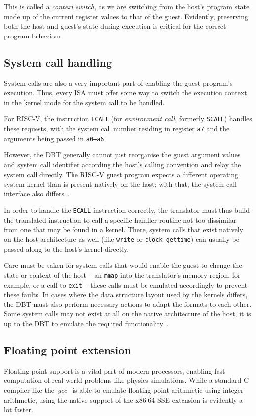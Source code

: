 This is called a \textit{context switch}, as we are switching from the host's program state made up of the current register values to that of the guest.
Evidently, preserving both the host and guest's state during execution is critical for the correct program behaviour.

\subsection{System call handling}
\label{sec:syscall-handling}
System calls are also a very important part of enabling the guest program's execution.
Thus, every ISA must offer some way to switch the execution context in the kernel mode for the system call to be handled.

For RISC-V, the instruction \texttt{ECALL} (for \textit{environment call}, formerly \texttt{SCALL}) handles these requests, with the system call number residing in register \texttt{a7} and the arguments being passed in \texttt{a0--a6}.

However, the DBT generally cannot just reorganise the guest argument values and system call identifier according the host's calling convention and relay the system call directly.
The RISC-V guest program expects a different operating system kernel than is present natively on the host;
with that, the system call interface also differs~\cite[S. 2f.]{bintrans}.

In order to handle the \texttt{ECALL} instruction correctly, the translator must thus build the translated instruction to call a specific handler routine not too dissimilar from one that may be found in a kernel.
There, system calls that exist natively on the host architecture as well (like \texttt{write} or \texttt{clock\_gettime}) can usually be passed along to the host's kernel directly.

Care must be taken for system calls that would enable the guest to change the state or context of the host -- an \texttt{mmap} into the translator's memory region, for example, or a call to \texttt{exit} -- these calls must be emulated accordingly to prevent these faults.
In cases where the data structure layout used by the kernels differs, the DBT must also perform necessary actions to adapt the formats to each other.
Some system calls may not exist at all on the native architecture of the host, it is up to the DBT to emulate the required functionality~\cite[S. 2f.]{bintrans}.

\subsection{Floating point extension}
\label{subsec:fp_extension}
Floating point support is a vital part of modern processors, enabling fast computation of real world problems like physics simulations.
While a standard C compiler like the~\textit{gcc}~\cite{gcc-web} is able to emulate floating point arithmetic using integer arithmetic, using the native support of the x86-64 SSE extension is evidently a lot faster.

